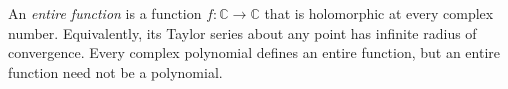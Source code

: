 
An \emph{entire function} is a function $f:\mathbb C\to\mathbb C$ that is holomorphic at every complex number. Equivalently, its Taylor series about any point has infinite radius of convergence. Every complex polynomial defines an entire function, but an entire function need not be a polynomial.
